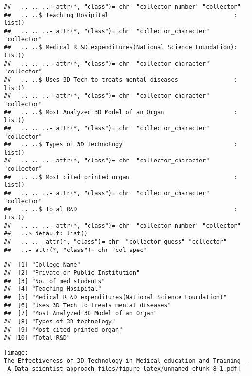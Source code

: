 \documentclass[]{article}
\newenvironment{Shaded}{\begin{snugshade}}{\end{snugshade}}
\newcommand{\DataTypeTok}[1]{\textcolor[rgb]{0.13,0.29,0.53}{#1}}
\newcommand{\KeywordTok}[1]{\textcolor[rgb]{0.13,0.29,0.53}{\textbf{#1}}}
\newcommand{\NormalTok}[1]{#1}
\newcommand{\OperatorTok}[1]{\textcolor[rgb]{0.81,0.36,0.00}{\textbf{#1}}}
\newcommand{\StringTok}[1]{\textcolor[rgb]{0.31,0.60,0.02}{#1}}
\begin{document}
\begin{verbatim}
##   .. .. ..- attr(*, "class")= chr  "collector_number" "collector"
##   .. ..$ Teaching Hosipital                                    : list()
##   .. .. ..- attr(*, "class")= chr  "collector_character" "collector"
##   .. ..$ Medical R &D expenditures(National Science Foundation): list()
##   .. .. ..- attr(*, "class")= chr  "collector_character" "collector"
##   .. ..$ Uses 3D Tech to treats mental diseases                : list()
##   .. .. ..- attr(*, "class")= chr  "collector_character" "collector"
##   .. ..$ Most Analyzed 3D Model of an Organ                    : list()
##   .. .. ..- attr(*, "class")= chr  "collector_character" "collector"
##   .. ..$ Types of 3D technology                                : list()
##   .. .. ..- attr(*, "class")= chr  "collector_character" "collector"
##   .. ..$ Most cited printed organ                              : list()
##   .. .. ..- attr(*, "class")= chr  "collector_character" "collector"
##   .. ..$ Total R&D                                             : list()
##   .. .. ..- attr(*, "class")= chr  "collector_number" "collector"
##   ..$ default: list()
##   .. ..- attr(*, "class")= chr  "collector_guess" "collector"
##   ..- attr(*, "class")= chr "col_spec"
\end{verbatim}

\begin{verbatim}
##  [1] "College Name"                                          
##  [2] "Private or Public Institution"                         
##  [3] "No. of med students"                                   
##  [4] "Teaching Hosipital"                                    
##  [5] "Medical R &D expenditures(National Science Foundation)"
##  [6] "Uses 3D Tech to treats mental diseases"                
##  [7] "Most Analyzed 3D Model of an Organ"                    
##  [8] "Types of 3D technology"                                
##  [9] "Most cited printed organ"                              
## [10] "Total R&D"
\end{verbatim}

\begin{Shaded}
\end{Shaded}

\texttt{[image: The\_Effectiveness\_of\_3D\_Technology\_in\_Medical\_education\_and\_Training\_\_\_A\_Data\_scientist\_approach\_files/figure-latex/unnamed-chunk-8-1.pdf]}
\end{document}
